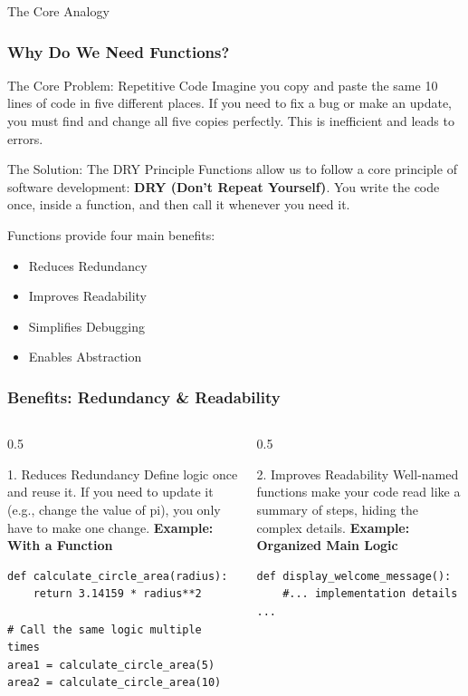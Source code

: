 \documentclass{beamer}
\begin{document}
\begin{frame}[fragile]
\begin{block}{The Core Analogy}
\begin{frame}[fragile]
    \frametitle{Why Do We Need Functions?}
    \begin{block}{The Core Problem: Repetitive Code}
        Imagine you copy and paste the same 10 lines of code in five different places. If you need to fix a bug or make an update, you must find and change all five copies perfectly. This is inefficient and leads to errors.
    \end{block}

    \begin{block}{The Solution: The DRY Principle}
        Functions allow us to follow a core principle of software development: \textbf{DRY (Don't Repeat Yourself)}. You write the code once, inside a function, and then call it whenever you need it.
    \end{block}

    \vspace{1em}
    Functions provide four main benefits:
    \begin{itemize}
        \item Reduces Redundancy
        \item Improves Readability
        \item Simplifies Debugging
        \item Enables Abstraction
    \end{itemize}
\end{frame}

\begin{frame}[fragile]
    \frametitle{Benefits: Redundancy \& Readability}
    \begin{columns}[T] %
        \begin{column}{0.5\textwidth}
            \begin{block}{1. Reduces Redundancy}
                Define logic once and reuse it. If you need to update it (e.g., change the value of pi), you only have to make one change.
                \vfill
                \textbf{Example: With a Function}
\begin{verbatim}
def calculate_circle_area(radius):
    return 3.14159 * radius**2

# Call the same logic multiple times
area1 = calculate_circle_area(5)
area2 = calculate_circle_area(10)
\end{verbatim}
            \end{block}
        \end{column}
        \begin{column}{0.5\textwidth}
            \begin{block}{2. Improves Readability}
                Well-named functions make your code read like a summary of steps, hiding the complex details.
                \vfill
                \textbf{Example: Organized Main Logic}
\begin{verbatim}
def display_welcome_message():
    #... implementation details ...


\end{verbatim}
\end{block}
\end{column}
\end{columns}
\end{frame}
\end{block}
\end{frame}
\end{document}
